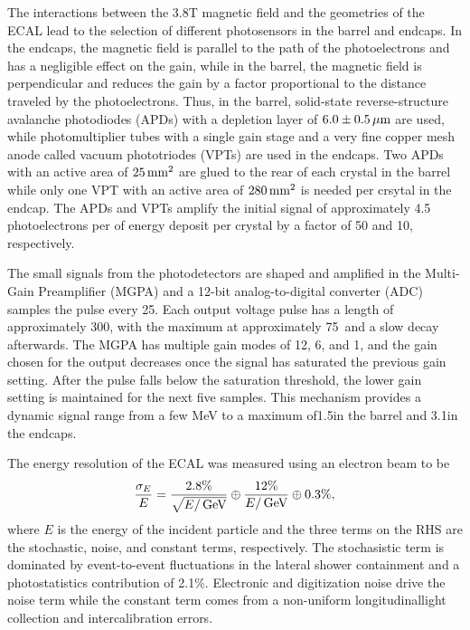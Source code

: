 The interactions between the 3.8\unit{T} magnetic field and the geometries of the ECAL lead to the selection of different photosensors in the barrel and endcaps.
In the endcaps, the magnetic field is parallel to the path of the photoelectrons and has a negligible effect on the gain, while in the barrel, the magnetic field is perpendicular and reduces the gain by a factor proportional to the distance traveled by the photoelectrons.
Thus, in the barrel, solid-state reverse-structure avalanche photodiodes (APDs) with a depletion layer of $6.0\pm0.5\,\mu\text{m}$ are used, while photomultiplier tubes with a single gain stage and a very fine copper mesh anode called vacuum phototriodes (VPTs) are used in the endcaps. 
Two APDs with an active area of $25\,\text{mm}^2$ are glued to the rear of each crystal in the barrel while only one VPT with an active area of $280\,\text{mm}^2$ is needed per crsytal in the endcap.
The APDs and VPTs amplify the initial signal of approximately 4.5 photoelectrons per \MeV of energy deposit per crystal by a factor of 50 and 10, respectively. 

The small signals from the photodetectors are shaped and amplified in the Multi-Gain Preamplifier (MGPA) and a 12-bit analog-to-digital converter (ADC) samples the pulse every 25\ns.
Each output voltage pulse has a length of approximately 300\ns, with the maximum at approximately 75\ns\ and a slow decay afterwards. 
The MGPA has multiple gain modes of 12, 6, and 1, and the gain chosen for the output decreases once the signal has saturated the previous gain setting.
After the pulse falls below the saturation threshold, the lower gain setting is maintained for the next five samples.
This mechanism provides a dynamic signal range from a few MeV to a maximum of1.5\TeV in the barrel and 3.1\TeV in the endcaps.

The energy resolution of the ECAL was measured using an electron beam to be
\begin{equation}
  \frac{\sigma_E}{E} = \frac{2.8\%}{\sqrt{E/\,\text{Ge\hspace{-.08em}V}}} \oplus \frac{12\%}{E/\,\text{Ge\hspace{-.08em}V}} \oplus 0.3\%,
\end{equation}
where $E$ is the energy of the incident particle and the three terms on the RHS are the stochastic, noise, and constant terms, respectively.
The stochasistic term is dominated by event-to-event fluctuations in the lateral shower containment and a photostatistics contribution of 2.1\%.
Electronic and digitization noise drive the noise term while the constant term comes from a non-uniform longitudinallight collection and intercalibration errors.

